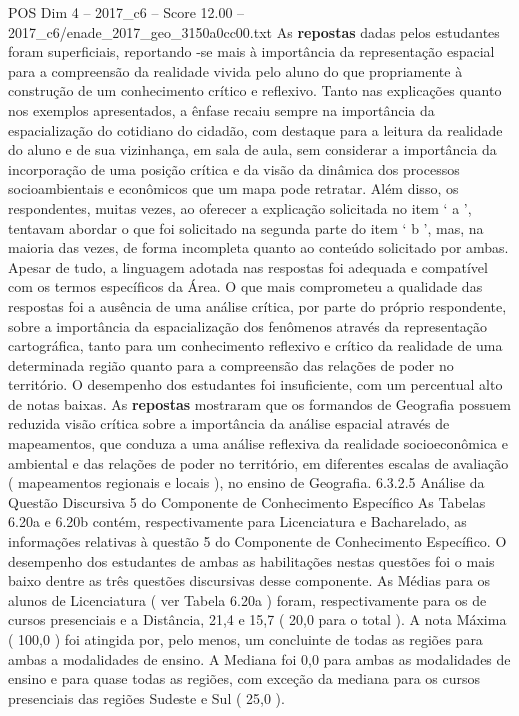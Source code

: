 \begin{textsample}{POS Dim 4 – 2017\_c6 – Score 12.00 – 2017\_c6/enade\_2017\_geo\_3150a0cc00.txt}
As \textbf{repostas} dadas pelos estudantes foram superficiais, reportando -se mais à importância da representação espacial para a compreensão da realidade vivida pelo aluno do que propriamente à construção de um conhecimento crítico e reflexivo.
Tanto nas explicações quanto nos exemplos apresentados, a ênfase recaiu sempre na importância da espacialização do cotidiano do cidadão, com destaque para a leitura da realidade do aluno e de sua vizinhança, em sala de aula, sem considerar a importância da incorporação de uma posição crítica e da visão da dinâmica dos processos socioambientais e econômicos que um mapa pode retratar.
Além disso, os respondentes, muitas vezes, ao oferecer a explicação solicitada no item ‘ a ’, tentavam abordar o que foi solicitado na segunda parte do item ‘ b ’, mas, na maioria das vezes, de forma incompleta quanto ao conteúdo solicitado por ambas.
Apesar de tudo, a linguagem adotada nas respostas foi adequada e compatível com os termos específicos da Área.
O que mais comprometeu a qualidade das respostas foi a ausência de uma análise crítica, por parte do próprio respondente, sobre a importância da espacialização dos fenômenos através da representação cartográfica, tanto para um conhecimento reflexivo e crítico da realidade de uma determinada região quanto para a compreensão das relações de poder no território.
O desempenho dos estudantes foi insuficiente, com um percentual alto de notas baixas.
As \textbf{repostas} mostraram que os formandos de Geografia possuem reduzida visão crítica sobre a importância da análise espacial através de mapeamentos, que conduza a uma análise reflexiva da realidade socioeconômica e ambiental e das relações de poder no território, em diferentes escalas de avaliação ( mapeamentos regionais e locais ), no ensino de Geografia. 6.3.2.5 Análise da Questão Discursiva 5 do Componente de Conhecimento Específico As Tabelas 6.20a e 6.20b contém, respectivamente para Licenciatura e Bacharelado, as informações relativas à questão 5 do Componente de Conhecimento Específico.
O desempenho dos estudantes de ambas as habilitações nestas questões foi o mais baixo dentre as três questões discursivas desse componente.
As Médias para os alunos de Licenciatura ( ver Tabela 6.20a ) foram, respectivamente para os de cursos presenciais e a Distância, 21,4 e 15,7 ( 20,0 para o total ).
A nota Máxima ( 100,0 ) foi atingida por, pelo menos, um concluinte de todas as regiões para ambas a modalidades de ensino.
A Mediana foi 0,0 para ambas as modalidades de ensino e para quase todas as regiões, com exceção da mediana para os cursos presenciais das regiões Sudeste e Sul ( 25,0 ).

\end{textsample}
